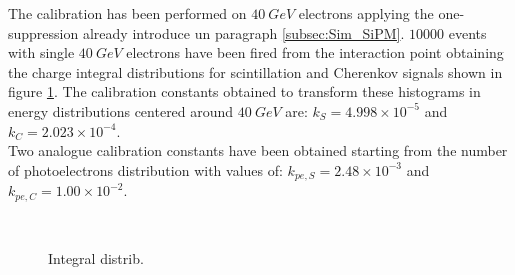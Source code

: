The calibration has been performed on $40\ GeV$ electrons applying the one-suppression already introduce un paragraph \ref{subsec:Sim_SiPM}. $10000$ events with single $40\ GeV$ electrons have been fired from the interaction point obtaining the charge integral distributions for scintillation and Cherenkov signals shown in figure \ref{fig:int_dist}. The calibration constants obtained to transform these histograms in energy distributions centered around $40\ GeV$ are: $k_S = 4.998 \times 10^{-5}$ and $k_C = 2.023 \times 10^{-4}$.\\
Two analogue calibration constants have been obtained starting from the number of photoelectrons distribution with values of:  $k_{pe,S} = 2.48 \times 10^{-3}$ and $k_{pe,C} = 1.00 \times 10^{-2}$.\\

\begin{figure}
	\centering
	 \\
	\caption{Integral distrib.}
	\label{fig:int_dist}
\end{figure}

